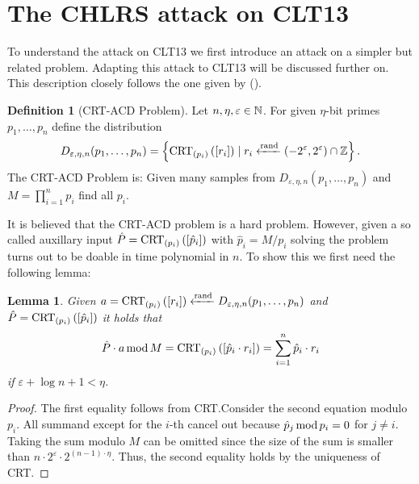 \documentclass[english]{scrartcl}
\theoremstyle{plain}
\newtheorem{lemma}{Lemma}
\theoremstyle{definition}
\newtheorem{definition}{Definition}
\begin{document}
    \section{The CHLRS attack on CLT13}

    To understand the attack on CLT13 we first introduce an attack on a simpler but related problem. Adapting this attack to CLT13 will be discussed further on. This description closely follows the one given by \citeauthor*{cryptoeprint:2014:906} (\cite{cryptoeprint:2014:906}).

    \begin{definition}[CRT-ACD Problem]
        Let $n, \eta, \varepsilon \in \mathbb{N}$. For given $\eta$-bit primes $p_1, \dots, p_n$ define the distribution
        \begin{equation*}
            D_{\varepsilon, \eta, n}(p_1, \dots, p_n) = \left\lbrace \operatorname{CRT}_{(p_{i})}\left(\left[r_i\right]\right) \mid r_i \xleftarrow{\mathrm{rand}} (-2^\varepsilon, 2^\varepsilon) \cap \mathbb{Z} \right\rbrace.
        \end{equation*}
        The CRT-ACD Problem is: Given many samples from $D_{\varepsilon, \eta, n}(p_1, \dots, p_n)$ and $M = \prod_{i=1}^n p_i$ find all $p_i$.
    \end{definition}

    It is believed that the CRT-ACD problem is a hard problem. However, given a so called auxillary input $\hat{P} = \operatorname{CRT}_{(p_{i})}\left(\left[\hat{p}_i\right]\right)$ with $\hat{p}_i = M / p_i$ solving the problem turns out to be doable in time polynomial in $n$.
    To show this we first need the following lemma:
    \begin{lemma}\label{lem:1}
        Given $a = \operatorname{CRT}_{(p_{i})}\left(\left[r_i\right]\right) \xleftarrow{\mathrm{rand}} D_{\varepsilon, \eta, n}(p_1, \dots, p_n)$ and $\hat{P} = \operatorname{CRT}_{(p_{i})}\left(\left[\hat{p}_i\right]\right)$ it holds that
        \begin{equation*}
            \hat{P} \cdot a \operatorname{mod} M = \operatorname{CRT}_{(p_{i})}\left(\left[\hat{p}_i \cdot r_i\right]\right) = \sum_{i=1}^n \hat{p}_i \cdot r_i
        \end{equation*}
        if $\varepsilon + \log n + 1 < \eta$.
    \end{lemma}
    \begin{proof}
        The first equality follows from CRT.\@ Consider the second equation modulo $p_i$. All summand except for the $i$-th cancel out because $\hat{p}_j \operatorname{mod} p_i = 0$ for $j \neq i$. Taking the sum modulo $M$ can be omitted since the size of the sum is smaller than $n \cdot 2^\varepsilon \cdot 2^{(n-1)\cdot\eta}$. Thus, the second equality holds by the uniqueness of CRT.
    \end{proof}
\end{document}
